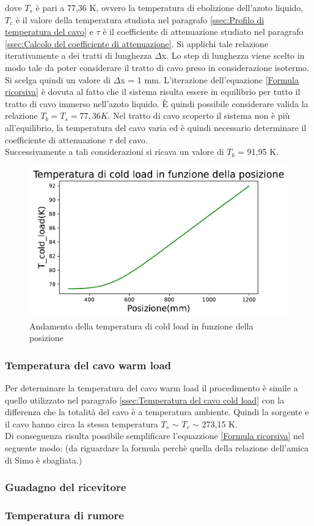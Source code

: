 dove $T_{s}$ è pari a 77,36 K, ovvero la temperatura di ebolizione dell'azoto liquido, $T_{c}$ è il valore della temperatura studiata nel paragrafo \ref{ssec:Profilo di temperatura del cavo} e $\tau$ è il coefficiente di attenuazione studiato nel paragrafo \ref{ssec:Calcolo del coefficiente di attenuazione}.
Si applichi tale relazione iterativamente a dei tratti di lunghezza $\Delta$x. Lo step di lunghezza viene scelto in modo tale da poter considerare il tratto di cavo preso in considerazione isotermo. Si scelga quindi un valore di $\Delta$x = 1 mm.
L'iterazione dell'equazione \eqref{Formula ricorsiva} è dovuta al fatto che il sistema risulta essere in equilibrio per tutto il tratto di cavo immerso nell'azoto liquido. \`E quindi possibile considerare valida la relazione $T_{b} = T_{s} = 77,36 K$. Nel tratto di cavo scoperto il sistema non è più all'equilibrio, la temperatura del cavo varia ed è quindi necessario determinare il coefficiente di attenuazione $\tau$ del cavo.\\
Successivamente a tali considerazioni si ricava un valore di $T_{b}$ = 91,95 K.

\begin{figure}[h]
	\centering
	\includegraphics[scale=0.8]{Temperatura_vs_posizione.pdf}
	\caption{Andamento della temperatura di cold load in funzione della posizione}
    	\label{fig:Temperatura_vs_posizione}
\end{figure}


\subsubsection{Temperatura del cavo warm load}

Per determinare la temperatura del cavo warm load il procedimento è simile a quello utilizzato nel paragrafo \ref{ssec:Temperatura del cavo cold load} con la differenza che la totalità del cavo è a temperatura ambiente. Quindi la sorgente e il cavo hanno circa la stessa temperatura $T_{s}$ $\sim$ $T_{c}$ $\sim$ 273,15 K.\\
Di conseguenza risulta possibile semplificare l'equazzione \eqref{Formula ricorsiva} nel seguente modo:
(da riguardare la formula perchè quella della relazione dell'amica di Simo è sbagliata.)

\subsubsection{Guadagno del ricevitore}
\subsubsection{Temperatura di rumore}
